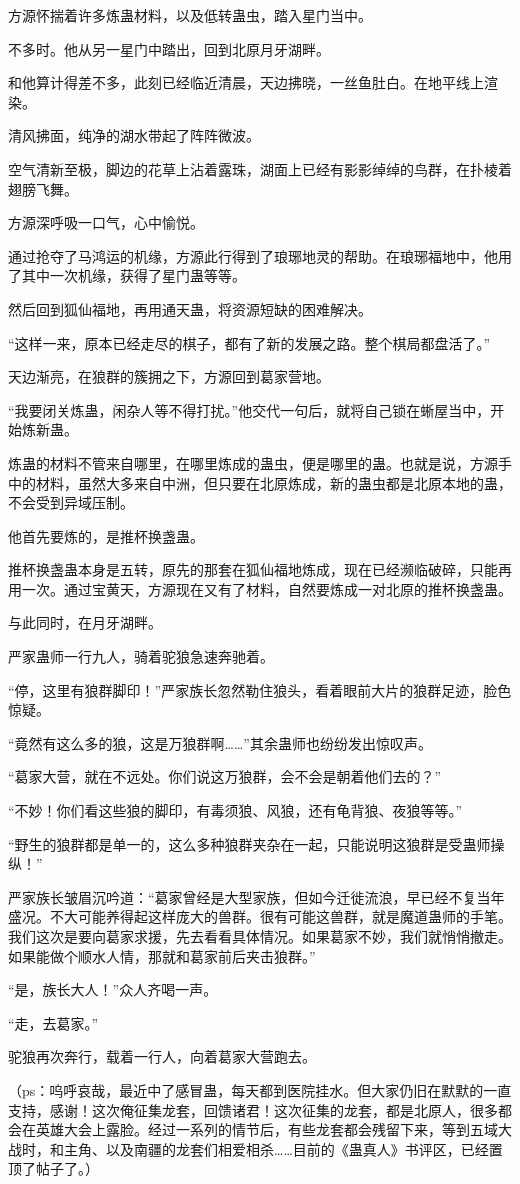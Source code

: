 \begin{this_body}
方源怀揣着许多炼蛊材料，以及低转蛊虫，踏入星门当中。

不多时。他从另一星门中踏出，回到北原月牙湖畔。

和他算计得差不多，此刻已经临近清晨，天边拂晓，一丝鱼肚白。在地平线上渲染。

清风拂面，纯净的湖水带起了阵阵微波。

空气清新至极，脚边的花草上沾着露珠，湖面上已经有影影绰绰的鸟群，在扑棱着翅膀飞舞。

方源深呼吸一口气，心中愉悦。

通过抢夺了马鸿运的机缘，方源此行得到了琅琊地灵的帮助。在琅琊福地中，他用了其中一次机缘，获得了星门蛊等等。

然后回到狐仙福地，再用通天蛊，将资源短缺的困难解决。

“这样一来，原本已经走尽的棋子，都有了新的发展之路。整个棋局都盘活了。”

天边渐亮，在狼群的簇拥之下，方源回到葛家营地。

“我要闭关炼蛊，闲杂人等不得打扰。”他交代一句后，就将自己锁在蜥屋当中，开始炼新蛊。

炼蛊的材料不管来自哪里，在哪里炼成的蛊虫，便是哪里的蛊。也就是说，方源手中的材料，虽然大多来自中洲，但只要在北原炼成，新的蛊虫都是北原本地的蛊，不会受到异域压制。

他首先要炼的，是推杯换盏蛊。

推杯换盏蛊本身是五转，原先的那套在狐仙福地炼成，现在已经濒临破碎，只能再用一次。通过宝黄天，方源现在又有了材料，自然要炼成一对北原的推杯换盏蛊。

与此同时，在月牙湖畔。

严家蛊师一行九人，骑着驼狼急速奔驰着。

“停，这里有狼群脚印！”严家族长忽然勒住狼头，看着眼前大片的狼群足迹，脸色惊疑。

“竟然有这么多的狼，这是万狼群啊……”其余蛊师也纷纷发出惊叹声。

“葛家大营，就在不远处。你们说这万狼群，会不会是朝着他们去的？”

“不妙！你们看这些狼的脚印，有毒须狼、风狼，还有龟背狼、夜狼等等。”

“野生的狼群都是单一的，这么多种狼群夹杂在一起，只能说明这狼群是受蛊师操纵！”

严家族长皱眉沉吟道：“葛家曾经是大型家族，但如今迁徙流浪，早已经不复当年盛况。不大可能养得起这样庞大的兽群。很有可能这兽群，就是魔道蛊师的手笔。我们这次是要向葛家求援，先去看看具体情况。如果葛家不妙，我们就悄悄撤走。如果能做个顺水人情，那就和葛家前后夹击狼群。”

“是，族长大人！”众人齐喝一声。

“走，去葛家。”

驼狼再次奔行，载着一行人，向着葛家大营跑去。

（ps：呜呼哀哉，最近中了感冒蛊，每天都到医院挂水。但大家仍旧在默默的一直支持，感谢！这次俺征集龙套，回馈诸君！这次征集的龙套，都是北原人，很多都会在英雄大会上露脸。经过一系列的情节后，有些龙套都会残留下来，等到五域大战时，和主角、以及南疆的龙套们相爱相杀……目前的《蛊真人》书评区，已经置顶了帖子了。）

\end{this_body}

